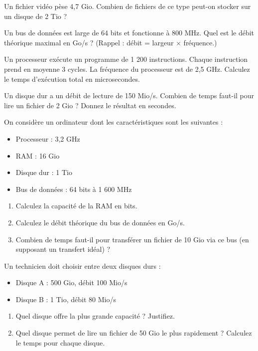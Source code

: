 \exo{}
Un fichier vidéo pèse 4,7 Gio. Combien de fichiers de ce type peut-on stocker sur un disque de 2 Tio ?

\exo{}
Un bus de données est large de 64 bits et fonctionne à 800 MHz. Quel est le débit théorique maximal en Go/s ? (Rappel : débit = largeur × fréquence.)

\exo{}
Un processeur exécute un programme de 1 200 instructions. Chaque instruction prend en moyenne 3 cycles. La fréquence du processeur est de 2,5 GHz. Calculez le temps d’exécution total en microsecondes.

\exo{}
Un disque dur a un débit de lecture de 150 Mio/s. Combien de temps faut-il pour lire un fichier de 2 Gio ? Donnez le résultat en secondes.


\exo{}
On considère un ordinateur dont les caractéristiques sont les suivantes :
\begin{itemize}
    \item Processeur : 3,2 GHz
    \item RAM : 16 Gio
    \item Disque dur : 1 Tio
    \item Bus de données : 64 bits à 1 600 MHz
\end{itemize}
\begin{enumerate}
    \item Calculez la capacité de la RAM en bits.
    \item Calculez le débit théorique du bus de données en Go/s.
    \item Combien de temps faut-il pour transférer un fichier de 10 Gio via ce bus (en supposant un transfert idéal) ?
\end{enumerate}

\exo{}
Un technicien doit choisir entre deux disques durs :
\begin{itemize}
    \item Disque A : 500 Gio, débit 100 Mio/s
    \item Disque B : 1 Tio, débit 80 Mio/s
\end{itemize}
\begin{enumerate}
    \item Quel disque offre la plus grande capacité ? Justifiez.
    \item Quel disque permet de lire un fichier de 50 Gio le plus rapidement ? Calculez le temps pour chaque disque.
\end{enumerate}

